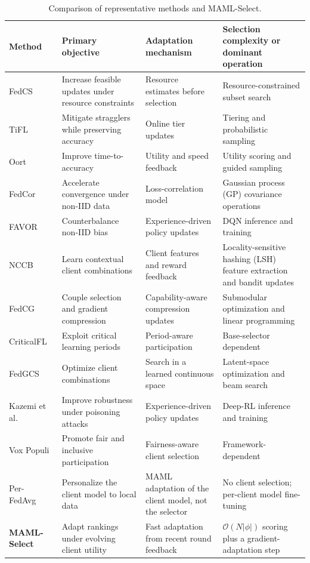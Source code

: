 \documentclass[journal]{IEEEtran}
\theoremstyle{remark}
\begin{document}
\begin{table}[!t]
    \color{black}
    \caption{Comparison of representative methods and MAML-Select.}
    \label{tab:related_work_comparison}
    \centering
    \footnotesize
    \setlength{\tabcolsep}{5pt}
    \renewcommand{\arraystretch}{1.15}
    \begin{tabularx}{\textwidth}{lXXX}
        \toprule
        \textbf{Method} & \textbf{Primary objective} & \textbf{Adaptation mechanism} & \textbf{Selection complexity or dominant operation} \\
        \midrule
        FedCS~\cite{nishio2019client} & Increase feasible updates under resource constraints & Resource estimates before selection & Resource-constrained subset search \\
        TiFL~\cite{chai2020tifl} & Mitigate stragglers while preserving accuracy & Online tier updates & Tiering and probabilistic sampling \\
        Oort~\cite{lai2021oort} & Improve time-to-accuracy & Utility and speed feedback & Utility scoring and guided sampling \\
        FedCor~\cite{tang2022fedcor} & Accelerate convergence under non-IID data & Loss-correlation model & Gaussian process (GP) covariance operations \\
        FAVOR~\cite{wang2020optimizing} & Counterbalance non-IID bias & Experience-driven policy updates & DQN inference and training \\
        NCCB~\cite{pan2024contextual} & Learn contextual client combinations & Client features and reward feedback & Locality-sensitive hashing (LSH) feature extraction and bandit updates \\
        FedCG~\cite{xu2024federated} & Couple selection and gradient compression & Capability-aware compression updates & Submodular optimization and linear programming \\
        CriticalFL~\cite{yan2023criticalfl} & Exploit critical learning periods & Period-aware participation & Base-selector dependent \\
        FedGCS~\cite{ning2024fedgcs} & Optimize client combinations & Search in a learned continuous space & Latent-space optimization and beam search \\
        Kazemi et al.~\cite{kazemi2026robust} & Improve robustness under poisoning attacks & Experience-driven policy updates & Deep-RL inference and training \\
        Vox Populi~\cite{arisdakessian2026vox} & Promote fair and inclusive participation & Fairness-aware client selection & Framework-dependent \\
        Per-FedAvg~\cite{fallah2020personalized} & Personalize the client model to local data & MAML adaptation of the client model, not the selector & No client selection; per-client model fine-tuning \\
        \textbf{MAML-Select} & Adapt rankings under evolving client utility & Fast adaptation from recent round feedback & $\mathcal{O}(N|\phi|)$ scoring plus a gradient-adaptation step \\
        \bottomrule
    \end{tabularx}
\end{table}
\end{document}
